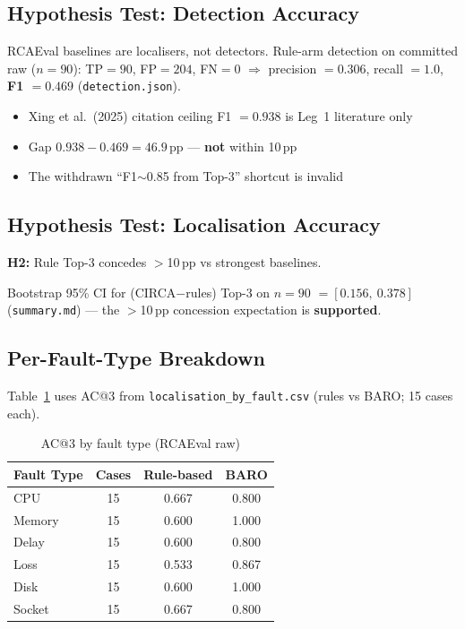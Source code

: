 \subsection{Hypothesis Test: Detection Accuracy}

RCAEval baselines are localisers, not detectors. Rule-arm detection on committed raw ($n{=}90$): TP$=90$, FP$=204$, FN$=0$ $\Rightarrow$ precision $=0.306$, recall $=1.0$, \textbf{F1 $=0.469$} (\texttt{detection.json}).

\begin{itemize}
    \item Xing et al.\ (2025) citation ceiling F1 $=0.938$ is Leg~1 literature only
    \item Gap $0.938-0.469=46.9$\,pp --- \textbf{not} within 10\,pp
    \item The withdrawn ``F1$\sim$0.85 from Top-3'' shortcut is invalid
\end{itemize}

\subsection{Hypothesis Test: Localisation Accuracy}

\textbf{H2:} Rule Top-3 concedes $>$10\,pp vs strongest baselines.

Bootstrap 95\% CI for (CIRCA$-$rules) Top-3 on $n{=}90$ $= [0.156,\ 0.378]$ (\texttt{summary.md}) --- the $>$10\,pp concession expectation is \textbf{supported}.

\subsection{Per-Fault-Type Breakdown}

Table~\ref{tab:rcaeval_faults} uses AC@3 from \texttt{localisation\_by\_fault.csv} (rules vs BARO; 15 cases each).

\begin{table}[h]
\centering
\caption{AC@3 by fault type (RCAEval raw)}
\label{tab:rcaeval_faults}
\begin{tabular}{lccc}
\hline
\textbf{Fault Type} & \textbf{Cases} & \textbf{Rule-based} & \textbf{BARO} \\
\hline
CPU & 15 & 0.667 & 0.800 \\
Memory & 15 & 0.600 & 1.000 \\
Delay & 15 & 0.600 & 0.800 \\
Loss & 15 & 0.533 & 0.867 \\
Disk & 15 & 0.600 & 1.000 \\
Socket & 15 & 0.667 & 0.800 \\
\hline
\end{tabular}
\end{table}

